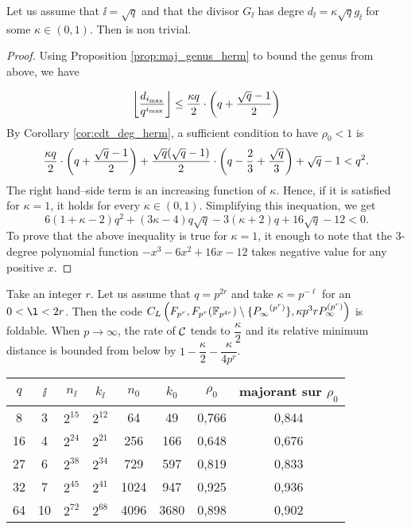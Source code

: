 \documentclass[10pt]{article}
\begin{document}
\begin{proposition}
	Let us assume that $\ii=\sqrt{q}$ and that the divisor $G_{\ii}$ has degre $d_{\ii} = \kappa \sqrt{q}g_{\ii}$ for some $\kappa \in (0,1)$.
	Then  is non trivial.
\end{proposition}
\begin{proof}
	Using Proposition \ref{prop:maj_genus_herm} to bound the genus from above, we have
	
	\[ \left\lfloor\dfrac{d_{i_{\rm{max}}}}{q^{i_{\rm{max}}}}\right\rfloor \leq  \dfrac{\kappa q}{2} \cdot \left( q + \dfrac{\sqrt{q}-1}{2} \right)\]
	By Corollary \ref{cor:cdt_deg_herm}, a sufficient condition to have $\rho_0 < 1$ is
	\[\dfrac{\kappa q}{2} \cdot \left( q + \dfrac{\sqrt{q}-1}{2} \right)+\dfrac{\sqrt{q}(\sqrt{q}-1)}{2}\cdot \left(q-\frac{2}{3} + \frac{\sqrt{q}}{3}\right) + \sqrt{q}-1 < q^2.\]
	The right hand--side term is an increasing function of $\kappa$. Hence, if it is satisfied for $\kappa=1$, it holds for every $\kappa \in (0,1)$. Simplifying this inequation, we get 
	\[6(1+\kappa - 2) q^2 + (3\kappa-4)q\sqrt{q}-3(\kappa+2)q+16\sqrt{q}-12 <0.\]
	To prove that the above inequality is true for $\kappa=1$, it enough to note that the 3-degree polynomial function $-x^3-6x^2+16x-12$ takes negative value for any positive $x$.
\end{proof}

Take an integer $r$. Let us assume that $q=p^{2r}$ and take $\kappa=p^{-\ell}$ for an $0<\l<2r$. Then the code $C_L\left(F_{p^r},F_{p^r}( \mathbb{F}_{p^{4r}} )\setminus\{ {P_\infty}^{(p^r)} \}, \kappa p^3rP_\infty^{(p^r)}\right)$ is foldable. When $p \rightarrow \infty$, the rate of $\mathcal{C}$ tends to $\dfrac{\kappa}{2}$ and its relative minimum distance is bounded from below by $1-\dfrac{\kappa}{2}-\dfrac{\kappa}{4p^r}$.


\newpage

\begin{center}
\begin{tabular}{|c|c|c|c|c|c|c|c|}
\hline
$q$ & $\ii$ & $n_{\ii}$ & $k_{\ii}$ & $n_0$ & $k_0$ & $\rho_0$ & majorant sur $\rho_0$ \\ 
\hline
8 & 3 & $2^{15}$ & $2^{12}$ & 64 & 49 & 0,766 & 0,844 \\
\hline
16 & 4 & $2^{24}$ & $2^{21}$ & 256 & 166 & 0,648 & 0,676 \\
\hline
27 & 6 & $2^{38}$ & $2^{34}$ & 729 & 597 & 0,819 & 0,833 \\
\hline
32 & 7 & $2^{45}$ & $2^{41}$ & 1024 & 947 & 0,925 & 0,936 \\
\hline
64 & 10 & $2^{72}$ & $2^{68}$ & 4096 & 3680 & 0,898 & 0,902 \\
\hline
\end{tabular}
\end{center}
\end{document}
